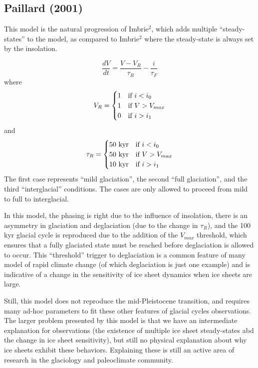 \documentclass[12pt]{article}
\theoremstyle{definition}
\begin{document}
\subsection{Paillard (2001)}
This model is the natural progression of Imbrie$^2$, which adds multiple ``steady-states'' to the model, as compared to Imbrie$^2$ where the steady-state is always set by the insolation.
\begin{shaded}
\begin{equation}
\frac{dV}{dt} = \frac{V-V_R}{\tau_R} - \frac{i}{\tau_F}
\end{equation}
where 
\begin{align*}
V_R = \begin{cases} 1 & \hbox{if $i<i_0$} \\ 1 & \hbox{if $V>V_{max}$} \\ 0 & \hbox{if $i>i_1$} \end{cases}
\end{align*}
and
\begin{align*}
\tau_R = \begin{cases} 50 \text{ kyr} & \hbox{if $i<i_0$} \\ 50 \text{ kyr} & \hbox{if $V>V_{max}$} \\  10 \text{ kyr} & \hbox{if $i>i_1$} \end{cases}
\end{align*}
The first case represents ``mild glaciation'', the second ``full glaciation'', and the third ``interglacial'' conditions. The cases are only allowed to proceed from mild to full to interglacial.
\end{shaded}
In this model, the phasing is right due to the influence of insolation, there is an asymmetry in glaciation and deglaciation (due to the change in $\tau_R$), and the 100 kyr glacial cycle is reproduced due to the addition of the $V_{max}$ threshold, which ensures that a fully glaciated state must be reached before deglaciation is allowed to occur. This ``threshold'' trigger to deglaciation is a common feature of many model of rapid climate change (of which deglaciation is just one example) and is indicative of a change in the sensitivity of ice sheet dynamics when ice sheets are large.

Still, this model does not reproduce the mid-Pleistocene transition, and requires many ad-hoc parameters to fit these other features of glacial cycles observations. The larger problem presented by this model is that we have an intermediate explanation for observations (the existence of multiple ice sheet steady-states abd the change in ice sheet sensitivity), but still no physical explanation about why ice sheets exhibit these behaviors. Explaining these is still an active area of research in the glaciology and paleoclimate community.
\end{document}
